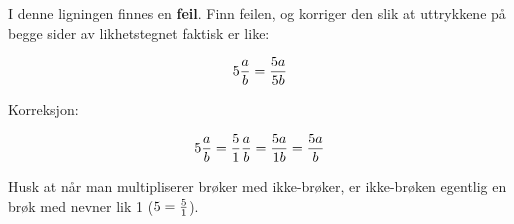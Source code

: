 

I denne ligningen finnes en {\bf feil}. Finn feilen, og korriger den slik at uttrykkene på begge sider av likhetstegnet faktisk er like:

$$5{a \over b} = {5a \over 5b}$$







Korreksjon:

$$5{a \over b} = {5 \over 1} {a \over b} = {5a \over 1b} = {5a \over b}$$







Husk at når man multipliserer brøker med ikke-brøker, er ikke-brøken egentlig en brøk med nevner lik 1 ($5 = {5 \over 1}$).



